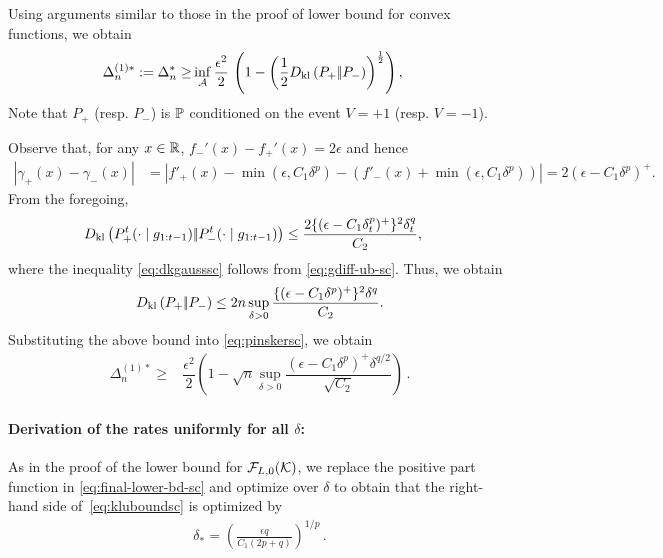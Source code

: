 Using arguments similar to those in the proof of lower bound for convex functions, we obtain
\begin{align}
\Delta_n^{(1)*}:=\Delta_n^{*} %
  \ge  &\inf_{\A} \dfrac{\epsilon^2 }{2}  \,\left( 1 - \left(\frac12\dkl{P_{+}}{P_{-}}\right)^{\frac{1}{2}}\right), \label{eq:pinskersc}
\end{align}
Note that $P_+$ (resp. $P_-$) is $\P$ conditioned on the event $V=+1$ (resp. $V=-1$).

Observe that, for any $x\in \R$, $f_-'(x) - f_+'(x) = 2\epsilon$ and hence
\begin{align}
 |\gamma_+(x) - \gamma_-(x)| 
& = | f'_+(x) - \min(\epsilon,C_1 \delta^p) - (f'_-(x)+\min(\epsilon,C_1 \delta^p)) | 
 = 2 (\epsilon - C_1 \delta^p)^+.
 \label{eq:gdiff-ub-sc}
\end{align}
From the foregoing, 
\begin{align}
 \MoveEqLeft \dkl{P_{+}^t(\cdot\mid g_{1:t-1})}{P_{-}^t(\cdot\mid g_{1:t-1})}
 \le  \dfrac{2\{(\epsilon-C_1\delta_t^p)^+\}^2\delta_t^q}{{C_2}},\label{eq:dkgausssc}
\end{align}
where the inequality \eqref{eq:dkgausssc} follows from \eqref{eq:gdiff-ub-sc}.
Thus, we obtain
\begin{align}
\dkl{P_{+}}{P_{-}} \le 2n \sup_{\delta>0} \dfrac{\{(\epsilon-C_1\delta^p)^+\}^2 \delta^q}{C_2}.
\label{eq:kluboundsc}
\end{align}
Substituting the above bound into \eqref{eq:pinskersc}, we obtain 
\begin{align}
 \Delta_n^{(1)*}
  \ge & \dfrac{\epsilon^2}{2} \left(1 - \sqrt{
    n}  \sup_{\delta>0}\dfrac{(\epsilon-C_1\delta^p)^+\delta^{q/2}}{\sqrt{C_2}}
  \right)\,.\label{eq:final-lower-bd-sc}
\end{align}


\paragraph{Derivation of the rates uniformly for all $\delta$:}
As in the proof of the lower bound for $\F_{L,0}(\K)$, we replace the positive part function in \eqref{eq:final-lower-bd-sc} and optimize over $\delta$ to obtain
that the right-hand side of~\eqref{eq:kluboundsc} is optimized by
\begin{align}
\delta_*=\left(\frac{ \epsilon q}{C_1(2p+q)}\right)^{1/p}\,.
\label{eq:deltastar-sc}
\end{align}

